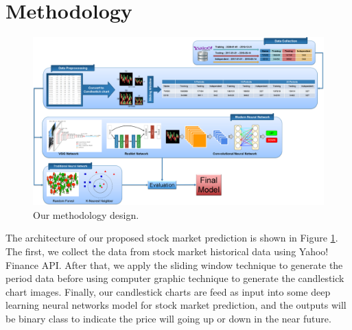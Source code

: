 \documentclass[10pt,twocolumn]{article}
\begin{document}
\section{Methodology}
\begin{figure}
\label{fig:methodologydesign}
  \includegraphics[width=\textwidth]{figures/methodology.png}
  \caption{Our methodology design.}
\end{figure}
The architecture of our proposed stock market prediction is shown in Figure \ref{fig:methodologydesign}. The first, we collect the data from stock market historical data using Yahoo! Finance API. After that, we apply the sliding window technique to generate the period data before using computer graphic technique to generate the candlestick chart images. Finally, our candlestick charts are feed as input into some deep learning neural networks model for stock market prediction, and the outputs will be binary class to indicate the price will going up or down in the near future.
\end{document}
